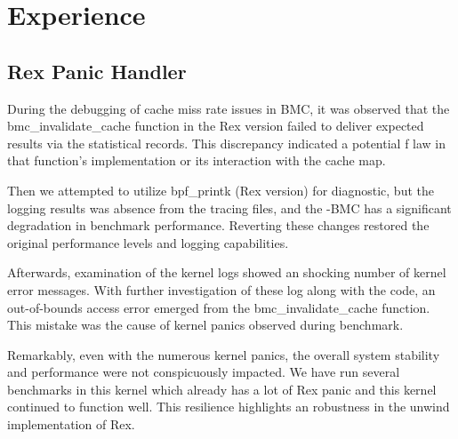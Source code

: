 \section{Experience}
\subsection{Rex Panic Handler}
During the debugging of cache miss rate issues in BMC, it was observed that the 
    bmc\_invalidate\_cache function in the Rex version failed to deliver expected 
    results via the statistical records. 
This discrepancy indicated a potential f law in that function's implementation 
    or its interaction with the cache map.
    
Then we attempted to utilize bpf\_printk (Rex version) for diagnostic, but 
    the logging results was absence from the tracing files, 
    and the \projname{}-BMC has a significant degradation in benchmark performance. 
Reverting these changes restored the original performance levels and logging capabilities.
    
Afterwards, examination of the kernel logs showed an shocking number of kernel error messages. 
With further investigation of these log along with the code, an out-of-bounds access error 
    emerged from the bmc\_invalidate\_cache function. 
This mistake was the cause of kernel panics observed during benchmark.
    
Remarkably, even with the numerous kernel panics, the overall system stability 
    and performance were not conspicuously impacted. 
We have run several benchmarks in this kernel which already has a lot of Rex panic 
    and this kernel continued to function well.
This resilience highlights an robustness in the unwind implementation of Rex.

